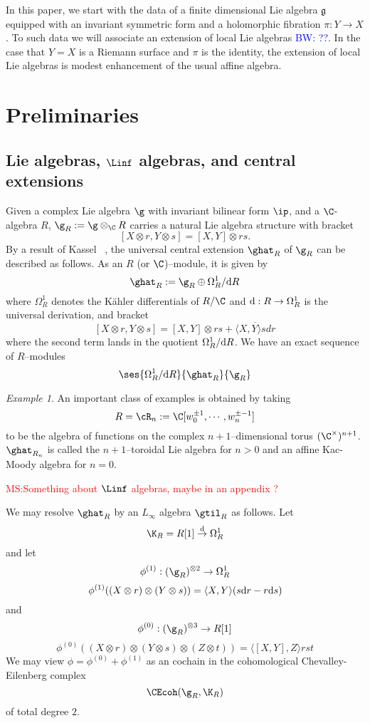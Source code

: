 \documentclass[12pt]{amsart}
\theoremstyle{definition}
\theoremstyle{remark}
\newtheorem{eg}[theorem]{Example}
\newcommand{\R}{R}
\def\d{{\rm d}}
\def\fg{\mathfrak{g}}
\def\brian{\textcolor{blue}{BW: }\textcolor{blue}}
\def\matt{\textcolor{red}{MS:}\textcolor{red}}
\begin{document}
In this paper, we start with the data of a finite dimensional Lie algebra $\fg$ equipped with an invariant symmetric form and a holomorphic fibration $\pi : Y \to X$. 
To such data we will associate an extension of local Lie algebras \brian{??}.
In the case that $Y = X$ is a Riemann surface and $\pi$ is the identity, the extension of local Lie algebras is modest enhancement of the usual affine algebra.


\section{Preliminaries}
\subsection{Lie algebras, $\Linf$ algebras, and central extensions}


Given a complex Lie algebra $\g$ with invariant bilinear form $\ip$, and a $\C$-algebra $\R$, $ \g_{\R} := \g \otimes_{\C} \R$ carries a natural Lie algebra structure with bracket
\[
[X \otimes r, Y \otimes s] = [X,Y] \otimes rs.
\]
By a result of Kassel ~\cite{Kassel}, the universal central extension $\ghat_{\R}$ of $\g_{\R}$ can be described as follows. As an $\R$ (or $\C$)--module, it is given by
\begin{equation} \label{uce}
\ghat_{\R} := \g_{\R} \oplus \Omega^1_{\R} / \d \R
\end{equation}
where $\Omega^1_{\R}$ denotes the K\"{a}hler differentials of $\R/\C$ and $\d: \R \rightarrow \Omega^{1}_{\R}$ is the universal derivation, and bracket
\[
[X \otimes r, Y \otimes s] =  [X,Y] \otimes rs + \overline{\langle X, Y \rangle s dr}
\]
where the second term lands in the quotient $\Omega^1_{\R} / \d \R$. We have an exact sequence of $\R$--modules
\[
\ses{\Omega^1_{\R} / \d \R}{\ghat_{\R}}{\g_{\R}}
\]

\begin{eg}

An important class of examples is obtained by taking
\[
\R= \cR_n := \C[w^{\pm 1}_0, \cdots, w^{\pm -1}_n]
\]
to be the algebra of functions on the complex $n+1$--dimensional torus $(\C^{\times})^{n+1}$. $\ghat_{\R_n}$ is called the $n+1$--toroidal Lie algebra for $n >0$ and an affine Kac-Moody algebra for $n=0$. 

\end{eg}

\matt{Something about $\Linf$ algebras, maybe in an appendix ?}

We may resolve $\ghat_{\R}$ by an $L_{\infty}$ algebra $\gtil_{\R}$ as follows. Let 
\[
\K_{\R} = \R[1] \overset{\d}{\rightarrow} \Omega^{1}_{\R}
\]
and let
$$ \phi^{(1)}: (\g_{\R})^{\otimes 2} \rightarrow \Omega^1_{\R} $$
$$ \phi^{(1)} ((X \otimes r) \otimes (Y \otimes s)) = \langle X, Y \rangle (s \d r - r \d s) $$
and 
$$ \phi^{(0)}: (\g_{\R})^{\otimes 3} \rightarrow R[1] $$
$$ \phi^{(0)}( (X \otimes r)\otimes(Y \otimes s) \otimes (Z \otimes t)) = \langle [X,Y], Z \rangle rst $$
We may view $\phi = \phi^{(0)} + \phi^{(1)}$ as an cochain in the cohomological Chevalley-Eilenberg complex $$ \CEcoh(\g_{\R}, \K_{\R}) $$ of total degree $2$.
\end{document}
